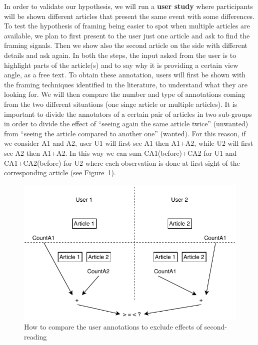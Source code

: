 

In order to validate our hypothesis, we will run a \textbf{user study} where participants will be shown different articles that present the same event with some differences.
To test the hypothesis of framing being easier to spot when multiple articles are available, we plan to first present to the user just one article and ask to find the framing signals. Then we show also the second article on the side with different details and ask again.
In both the steps, the input asked from the user is to highlight parts of the article(s) and to say why it is providing a certain view angle, as a free text. To obtain these annotation, users will first be shown with the framing techniques identified in the literature, to understand what they are looking for.
We will then compare the number and type of annotations coming from the two different situations (one singe article or multiple articles).
It is important to divide the annotators of a certain pair of articles in two sub-groups in order to divide the effect of ``seeing again the same article twice'' (unwanted) from ``seeing the article compared to another one'' (wanted). For this reason, if we consider A1 and A2, user U1 will first see A1 then A1+A2, while U2 will first see A2 then A1+A2. In this way we can sum CA1(before)+CA2 for U1 and CA1+CA2(before) for U2 where each observation is done at first sight of the corresponding article (see Figure~\ref{fig:user_study}).


\begin{figure}[!htb]
    \centering
    \includegraphics[width=\linewidth]{figures/diagram-user-study-flow.pdf}
    \caption{How to compare the user annotations to exclude effects of second-reading}
    \label{fig:user_study}
\end{figure}


